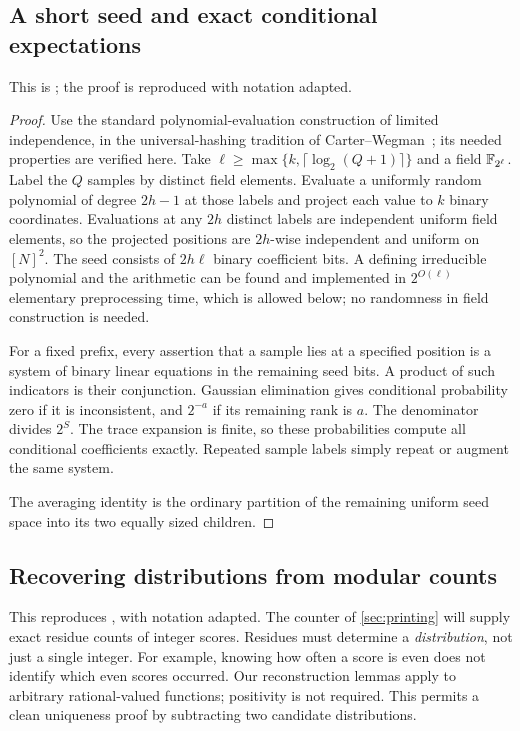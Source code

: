 \subsection{A short seed and exact conditional expectations}
\label{earlier:imp:seed}
This is \cite[Lemma~F.2]{Nag72}; the proof is reproduced with notation adapted.

\begin{proof}
Use the standard polynomial-evaluation construction of limited
independence, in the universal-hashing tradition of
Carter--Wegman~\cite{CarterWegman}; its needed properties are verified
here. Take $\ell\ge\max\{k,\lceil\log_2(Q+1)\rceil\}$ and a field
$\mathbb F_{2^\ell}$. Label the $Q$ samples by distinct field elements.
Evaluate a uniformly random polynomial of degree $2h-1$ at those labels
and project each value to $k$ binary coordinates. Evaluations at any
$2h$ distinct labels are independent uniform field elements, so the
projected positions are $2h$-wise independent and uniform on $[N]^2$.
The seed consists of $2h\ell$ binary coefficient bits. A defining
irreducible polynomial and the arithmetic can be found and implemented
in $2^{O(\ell)}$ elementary preprocessing time, which is allowed below;
no randomness in field construction is needed.

For a fixed prefix, every assertion that a sample lies at a specified
position is a system of binary linear equations in the remaining seed
bits. A product of such indicators is their conjunction. Gaussian
elimination gives conditional probability zero if it is inconsistent,
and $2^{-a}$ if its remaining rank is $a$. The denominator divides
$2^S$. The trace expansion is finite, so these probabilities compute
all conditional coefficients exactly. Repeated sample labels simply
repeat or augment the same system.

The averaging identity
is the ordinary partition of the remaining uniform seed space into its
two equally sized children. 
\end{proof}

\subsection{Recovering distributions from modular counts}\label{earlier:g:sec:windows}\label{earlier:gate-proof-group}\label{earlier:gate-window}

This reproduces \cite[Section~4]{NagCG}, with notation adapted. The counter of \cref{sec:printing} will supply exact residue counts of
integer scores. Residues must determine a \emph{distribution}, not just
a single integer. For example, knowing how often a score is even does not
identify which even scores occurred. Our reconstruction lemmas apply
to arbitrary rational-valued functions; positivity is not required.
This permits a clean uniqueness proof by subtracting two candidate
distributions.

